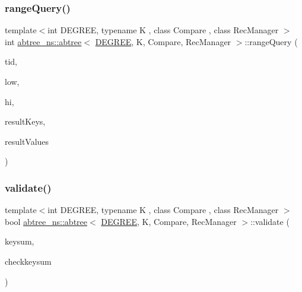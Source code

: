 \mbox{\label{classabtree__ns_1_1abtree_a3a820c6f4e9cc7af26106ecf808524c7}} 
\subsubsection{\texorpdfstring{range\+Query()}{rangeQuery()}\hspace{0.1cm}{\footnotesize\ttfamily [2/2]}}
{\footnotesize\ttfamily template$<$int D\+E\+G\+R\+EE, typename K , class Compare , class Rec\+Manager $>$ \\
int \hyperlink{classabtree__ns_1_1abtree}{abtree\+\_\+ns\+::abtree}$<$ \hyperlink{brown__sigouin__abtree__kcas_2adapter_8h_a5d88b17d70c985f2f2b8e987037fd6dd}{D\+E\+G\+R\+EE}, K, Compare, Rec\+Manager $>$\+::range\+Query (\begin{DoxyParamCaption}\item[{const int}]{tid,  }\item[{const K \&}]{low,  }\item[{const K \&}]{hi,  }\item[{K $\ast$const}]{result\+Keys,  }\item[{void $\ast$$\ast$const}]{result\+Values }\end{DoxyParamCaption})}

\mbox{\label{classabtree__ns_1_1abtree_afb8fab7fb71a7181ab344faf8187605c}} 
\subsubsection{\texorpdfstring{validate()}{validate()}\hspace{0.1cm}{\footnotesize\ttfamily [1/2]}}
{\footnotesize\ttfamily template$<$int D\+E\+G\+R\+EE, typename K , class Compare , class Rec\+Manager $>$ \\
bool \hyperlink{classabtree__ns_1_1abtree}{abtree\+\_\+ns\+::abtree}$<$ \hyperlink{brown__sigouin__abtree__kcas_2adapter_8h_a5d88b17d70c985f2f2b8e987037fd6dd}{D\+E\+G\+R\+EE}, K, Compare, Rec\+Manager $>$\+::validate (\begin{DoxyParamCaption}\item[{const long long}]{keysum,  }\item[{const bool}]{checkkeysum }\end{DoxyParamCaption})\hspace{0.3cm}{\ttfamily [inline]}}

